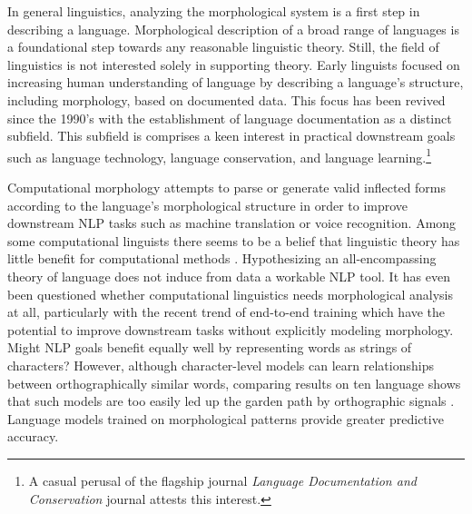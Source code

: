 \documentclass[12pt]{article}
\begin{document}
In general linguistics, analyzing the morphological system is a first step in describing a language. Morphological description of a broad range of languages is a foundational step towards any reasonable linguistic theory. Still, the field of linguistics is not interested solely in supporting theory. Early linguists focused on increasing human understanding of language by describing a language's structure, including morphology, based on documented data. This focus has been revived since the 1990's with the establishment of language documentation as a distinct subfield. This subfield is comprises a keen interest in practical downstream goals such as language technology, language conservation, and language learning.\footnote{A casual perusal of the flagship journal \textit{Language Documentation and Conservation} journal attests this interest.}

Computational morphology attempts to parse or generate valid inflected forms according to the language's morphological structure in order to improve downstream NLP tasks such as machine translation or voice recognition. Among some computational linguists there seems to be a belief that linguistic theory has little benefit for computational methods \cite{goldsmith_computational_2017}. Hypothesizing an all-encompassing theory of language does not induce from data a workable NLP tool. It has even been questioned whether computational linguistics needs morphological analysis at all, particularly with the recent trend of end-to-end training which have the potential to improve downstream tasks without explicitly modeling morphology. Might NLP goals benefit equally well by representing words as strings of characters? However, although character-level models can learn relationships between orthographically similar words, comparing results on ten language shows that such models are too easily led up the garden path by orthographic signals \cite{vania_characters_2017}. Language models trained on morphological patterns provide greater predictive accuracy.  
\end{document}
